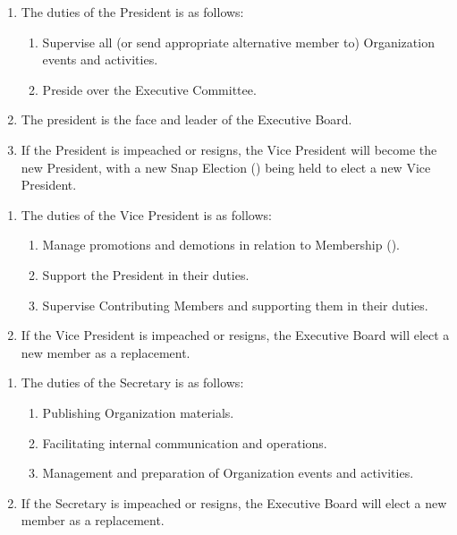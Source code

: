 
\begin{enumerate}
	\item The duties of the President is as follows:
		\begin{enumerate}
			\item Supervise all (or send appropriate alternative member to) Organization
				events and activities.

			\item Preside over the Executive Committee.
		\end{enumerate}

	\item The president is the face and leader of the Executive Board.

	\item If the President is impeached or resigns, the Vice President will become
		the new President, with a new Snap Election ()
		being held to elect a new Vice President.
\end{enumerate}

\begin{enumerate}
	\item The duties of the Vice President is as follows:
		\begin{enumerate}
			\item Manage promotions and demotions in relation to Membership ().

			\item Support the President in their duties.

			\item Supervise Contributing Members and supporting them in their duties.
		\end{enumerate}

	\item If the Vice President is impeached or resigns, the Executive Board will
		elect a new member as a replacement.
\end{enumerate}

\begin{enumerate}
	\item The duties of the Secretary is as follows:
		\begin{enumerate}
			\item Publishing Organization materials.

			\item Facilitating internal communication and operations.

			\item Management and preparation of Organization events and activities.
		\end{enumerate}

	\item If the Secretary is impeached or resigns, the Executive Board will elect
		a new member as a replacement.
\end{enumerate}

